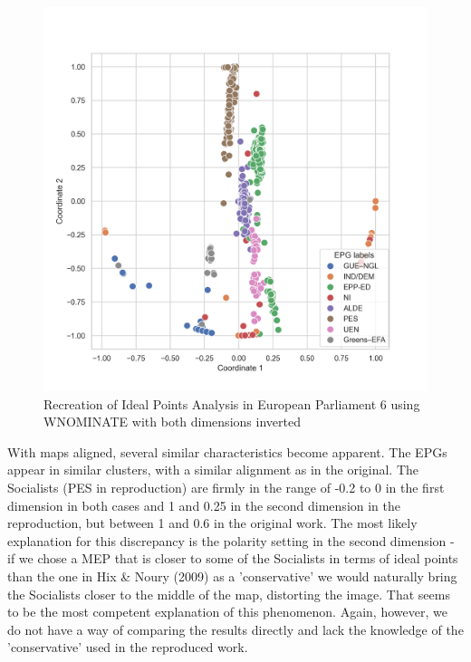 \documentclass{report}
\begin{document}
                \begin{figure}[H]
                    \centering
                    \includegraphics[width=1\textwidth]{Graphs/WNOMINATEflipped2d.png}
                    \caption
                    {Recreation of Ideal Points Analysis in European Parliament 6 using WNOMINATE with both dimensions
                    inverted}
                    \label{fig:WNOMINATE 6 FLIPPED}
                \end{figure}
                With maps aligned, several similar characteristics become apparent. The EPGs appear in similar
                clusters, with a similar alignment as in the original. The Socialists (PES in reproduction) are
                firmly in the range of
                -0.2 to 0 in the first dimension in both cases and 1 and 0.25 in the second dimension in the
                reproduction, but between 1 and 0.6 in the original work. The most likely explanation for this
                discrepancy is the polarity setting in the second dimension - if we chose a MEP that is closer to
                some of the
                Socialists in terms of ideal points than the one in Hix & Noury (2009) as a 'conservative' we would
                naturally
                bring the Socialists closer to the middle of the map, distorting the image. That seems to be the
                most competent explanation of this phenomenon. Again, however, we do not have a way of comparing the
                results directly and lack the knowledge of the 'conservative' used in the reproduced work.
\end{document}
